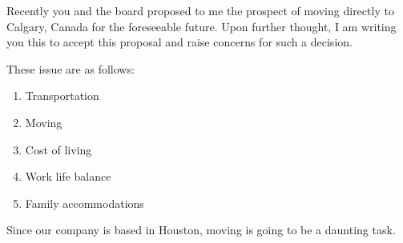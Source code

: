 \documentclass[letterpaper,11pt]{texMemo} %
\begin{document}
\maketitle %


Recently you and the board proposed to me the prospect of moving directly to Calgary, Canada for the foreseeable future.
Upon further thought, I am writing you this to accept this proposal and raise concerns for such a decision.

These issue are as follows:

\begin{enumerate}
\item Transportation
\item Moving
\item Cost of living
\item Work life balance
\item Family accommodations
\end{enumerate}

Since our company is based in Houston, moving is going to be a daunting task. 
\end{document}
